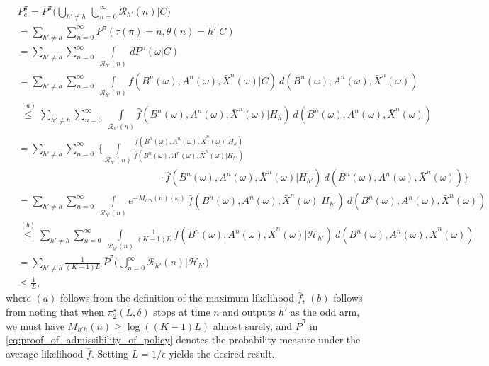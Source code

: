 \begin{align}
	& P^\pi_e =P^\pi\bigg(\bigcup\limits_{h'\neq h}\,\bigcup\limits_{n=0}^{\infty}\mathcal{R}_{h'}(n)\bigg\vert C\bigg)\nonumber\\
	&= \sum\limits_{h'\neq h}\sum\limits_{n=0}^{\infty}P^\pi(\tau(\pi)=n,\theta(n)=h'|C)\nonumber\\
	&= \sum\limits_{h'\neq h}\sum\limits_{n=0}^{\infty}~\int\limits_{\mathcal{R}_{h'}(n)}\,dP^\pi(\omega|C)\nonumber\\
	&=\sum\limits_{h'\neq h}\sum\limits_{n=0}^{\infty}~\int\limits_{\mathcal{R}_{h'}(n)}f(B^n(\omega), A^n(\omega), \bar{X}^n(\omega)|C)~d(B^n(\omega), A^n(\omega),\bar{X}^n(\omega))\nonumber\\
	& \stackrel{(a)}{\leq} \sum\limits_{h'\neq h}\sum\limits_{n=0}^{\infty}~\int\limits_{\mathcal{R}_{h'}(n)}\hat{f}(B^n(\omega), A^n(\omega), \bar{X}^n(\omega)| H_h)~d(B^n(\omega), A^n(\omega),\bar{X}^n(\omega))\nonumber\\
	&= \sum\limits_{h'\neq h}\sum\limits_{n=0}^{\infty}~\bigg\lbrace\int\limits_{\mathcal{R}_{h'}(n)}\frac{\hat{f}(B^n(\omega), A^n(\omega), \bar{X}^n(\omega)| H_h)}{\bar{f}(B^n(\omega), A^n(\omega), \bar{X}^n(\omega)| H_{h'})}\nonumber\\
	&\hspace{6cm}\cdot \bar{f}(B^n(\omega), A^n(\omega), \bar{X}^n(\omega)| H_{h'})~d(B^n(\omega), A^n(\omega),\bar{X}^n(\omega))\bigg\rbrace\nonumber\\
	&= \sum\limits_{h'\neq h}\sum\limits_{n=0}^{\infty}~\int\limits_{\mathcal{R}_{h'}(n)}e^{-M_{h'h}(n)(\omega)}~\bar{f}(B^n(\omega), A^n(\omega),\bar{X}^n(\omega)|H_{h'})~ d(B^n(\omega), A^n(\omega),\bar{X}^n(\omega))\nonumber\\
	&\stackrel{(b)}{\leq} \sum\limits_{h'\neq h}\sum\limits_{n=0}^{\infty}~\int\limits_{\mathcal{R}_{h'}(n)}\frac{1}{(K-1)L}~\bar{f}(B^n(\omega), A^n(\omega), \bar{X}^n(\omega)| \mathcal{H}_{h'})~d(B^n(\omega), A^n(\omega),\bar{X}^n(\omega))\nonumber\\
	&=\sum\limits_{h'\neq h}\frac{1}{(K-1)L}~\bar{P}^\pi\bigg(\bigcup\limits_{n=0}^{\infty}\mathcal{R}_{h'}(n)\bigg|\mathcal{H}_{h'}\bigg)\nonumber\\
	&\leq\frac{1}{L},
	\label{eq:proof_of_admissibility_of_policy}
\end{align}
where $(a)$ follows from the definition of the maximum likelihood $\hat{f}$, $(b)$ follows from noting that when $\pi_2^\star(L, \delta)$ stops at time $n$ and outputs $h'$ as the odd arm, we must have $M_{h'h}(n)\geq \log((K-1)L)$ almost surely, and $\bar{P}^\pi$ in \eqref{eq:proof_of_admissibility_of_policy} denotes the probability measure under the average likelihood $\bar{f}$. Setting $L=1/\epsilon$ yields the desired result.

